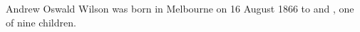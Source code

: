 
Andrew Oswald Wilson was born in Melbourne on 16 August 1866\cite{AOWisonBio}\cite{Argus1866Aug28}
to  and , one of nine children.
